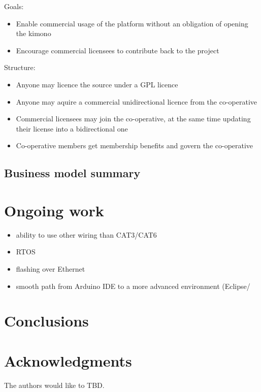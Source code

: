 \documentclass[draft,a4paper]{siamltex}
\begin{document}
Goals:
\begin{itemize}
  \item Enable commercial usage of the platform without an obligation
    of opening the kimono
  \item Encourage commercial licensees to contribute back to the
    project
\end{itemize}

Structure:
\begin{itemize}
  \item Anyone may licence the source under a GPL licence
  \item Anyone may aquire a commercial unidirectional licence from
    the co-operative
  \item Commercial licensees may join the co-operative, at the same
    time updating their license into a bidirectional one
  \item Co-operative members get membership benefits and govern the
    co-operative
\end{itemize}

\subsection{Business model summary}


\section{Ongoing work}
\label{sec:ongoing}

\begin{itemize}
  \item ability to use other wiring than CAT3/CAT6
  \item RTOS
  \item flashing over Ethernet
  \item smooth path from Arduino IDE to a more advanced environment
    (Eclipse/
\end{itemize}


\section{Conclusions}
\label{sec:conclusions}

\section*{Acknowledgments}

The authors would like to TBD.

{}

\end{document}
